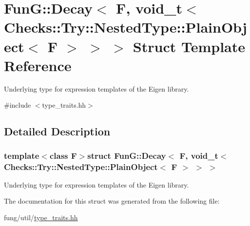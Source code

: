 \hypertarget{structFunG_1_1Decay_3_01F_00_01void__t_3_01Checks_1_1Try_1_1NestedType_1_1PlainObject_3_01F_01_4_01_4_01_4}{\section{\-Fun\-G\-:\-:\-Decay$<$ \-F, void\-\_\-t$<$ \-Checks\-:\-:\-Try\-:\-:\-Nested\-Type\-:\-:\-Plain\-Object$<$ \-F $>$ $>$ $>$ \-Struct \-Template \-Reference}
\label{structFunG_1_1Decay_3_01F_00_01void__t_3_01Checks_1_1Try_1_1NestedType_1_1PlainObject_3_01F_01_4_01_4_01_4}
}


\-Underlying type for expression templates of the \-Eigen library.  




{\ttfamily \#include $<$type\-\_\-traits.\-hh$>$}



\subsection{\-Detailed \-Description}
\subsubsection*{template$<$class F$>$struct Fun\-G\-::\-Decay$<$ F, void\-\_\-t$<$ Checks\-::\-Try\-::\-Nested\-Type\-::\-Plain\-Object$<$ F $>$ $>$ $>$}

\-Underlying type for expression templates of the \-Eigen library. 

\-The documentation for this struct was generated from the following file\-:\begin{DoxyCompactItemize}
\item 
fung/util/\hyperlink{type__traits_8hh}{type\-\_\-traits.\-hh}\end{DoxyCompactItemize}
